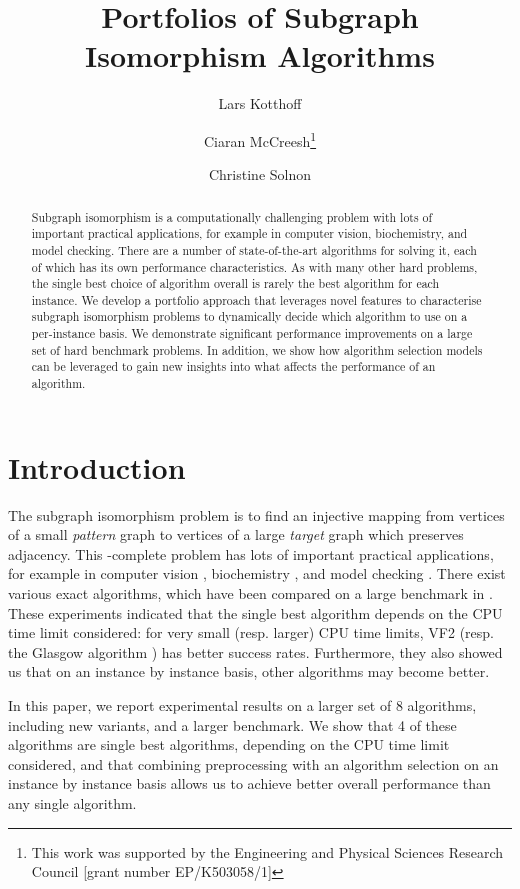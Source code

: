 \documentclass{llncs}
\title{Portfolios of Subgraph Isomorphism Algorithms}
\author{
    Lars Kotthoff\inst{1}
    \and Ciaran McCreesh\thanks{This work was supported by the Engineering
        and Physical Sciences Research Council [grant number EP/K503058/1]}\inst{2}
    \and Christine Solnon\inst{3}}
\institute{
    University of British Columbia, Vancouver, Canada
    \and University of Glasgow, Glasgow, Scotland
    \and INSA-Lyon, LIRIS, UMR5205, F-69621, France}
\begin{document}
\maketitle

\begin{abstract}
Subgraph isomorphism is a computationally challenging problem with lots of important practical
applications, for example in computer vision, biochemistry, and model checking. There are a number
of state-of-the-art algorithms for solving it, each of which has its own performance
characteristics. As with many other hard problems, the single best choice of algorithm overall is
rarely the best algorithm for each instance. We develop a portfolio approach that leverages novel
features to characterise subgraph isomorphism problems to dynamically decide which algorithm to use
on a per-instance basis. We demonstrate significant performance improvements on a large set of hard
benchmark problems. In addition, we show how algorithm selection models can be leveraged to gain new
insights into what affects the performance of an algorithm.
\end{abstract}

\section{Introduction}

The subgraph isomorphism problem is to find an injective mapping from vertices of a small
\emph{pattern} graph to vertices of a large \emph{target} graph which preserves adjacency. This
\NP-complete problem has lots of important practical applications, for example in computer vision
\cite{cviu11,pr15}, biochemistry \cite{Giugno:2013}, and model checking \cite{Sevegnani:2015}. There
exist various exact algorithms, which have been compared on a large benchmark in
\cite{McCreesh:2015}. These experiments indicated that the single best algorithm depends on the CPU
time limit considered: for very small (resp. larger) CPU time limits, VF2 \cite{Cordella:2004}
(resp. the Glasgow algorithm \cite{McCreesh:2015}) has better success rates. Furthermore, they also
showed us that on an instance by instance basis, other algorithms may become better.

In this paper, we report experimental results on a larger set of 8 algorithms, including new
variants, and a larger benchmark. We show that 4 of these algorithms are single best algorithms,
depending on the CPU time limit considered, and that combining preprocessing with an algorithm
selection on an instance by instance basis allows us to achieve better overall performance than any
single algorithm.
\end{document}

